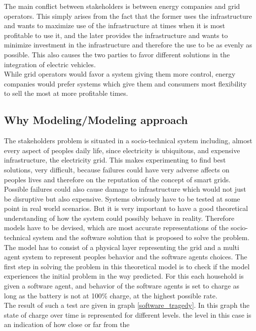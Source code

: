 \documentclass[a4paper]{article}
\begin{document}
The main conflict between stakeholders is between energy companies and grid operators. This simply arises from the 
fact that the former uses the infrastructure and wants to maximize use of the infrastructure at times when it is 
most profitable to use it, and the later provides the infrastructure and wants to minimize investment in the infrastructure
and therefore the use to be as evenly as possible. This also causes the two parties to favor different solutions 
in the integration of electric vehicles. \\
While grid operators would favor a system giving them more control, energy companies would prefer systems which give 
them and consumers most flexibility to sell the most at more profitable times. 

\subsection{Why Modeling/Modeling approach}
The stakeholders problem is situated in a socio-technical system including, almost every aspect of peoples daily life, 
since electricity is ubiquitous, and expensive infrastructure, the electricity grid. This makes experimenting to find 
best solutions, very difficult, because failures could have very adverse affects on peoples lives and therefore on the 
reputation of the concept of smart grids. Possible failures could also cause damage to infrastructure which would not just
be disruptive but also expensive. Systems obviously have to be tested at some point in real world scenarios. But it is 
very important to have a good theoretical understanding of how the system could possibly behave in reality. Therefore 
models have to be devised, which are most accurate representations of the socio-technical system and the 
software solution that is proposed to solve the problem. \\
The model has to consist of a physical layer representing the grid and a multi agent system to represent peoples 
behavior and the software agents choices. The first step in solving the problem in this theoretical model is 
to check if the model experiences the initial problem in the way predicted. For this each household is given a 
software agent, and behavior of the software agents is set to charge as long as the battery is not at 100\% charge,
at the highest possible rate.\\
The result of such a test are given in graph \ref{software_tragedy}. In this graph the state of charge over time is 
represented for different levels. the level in this case is an indication of how close or far from the 
\end{document}
